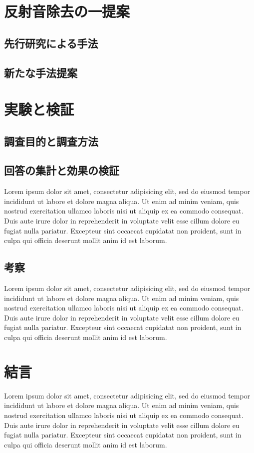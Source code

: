 \documentclass[a4j,12pt]{jarticle}
\begin{document}
\section{反射音除去の一提案}
\subsection{先行研究による手法}
\subsection{新たな手法提案}
\section{実験と検証}
\subsection{調査目的と調査方法}
\subsection{回答の集計と効果の検証}
Lorem ipsum dolor sit amet, consectetur adipisicing elit, sed do eiusmod tempor incididunt ut labore et dolore magna aliqua. Ut enim ad minim veniam, quis nostrud exercitation ullamco laboris nisi ut aliquip ex ea commodo consequat. Duis aute irure dolor in reprehenderit in voluptate velit esse cillum dolore eu fugiat nulla pariatur. Excepteur sint occaecat cupidatat non proident, sunt in culpa qui officia deserunt mollit anim id est laborum.
\subsection{考察}
Lorem ipsum dolor sit amet, consectetur adipisicing elit, sed do eiusmod tempor incididunt ut labore et dolore magna aliqua. Ut enim ad minim veniam, quis nostrud exercitation ullamco laboris nisi ut aliquip ex ea commodo consequat. Duis aute irure dolor in reprehenderit in voluptate velit esse cillum dolore eu fugiat nulla pariatur. Excepteur sint occaecat cupidatat non proident, sunt in culpa qui officia deserunt mollit anim id est laborum.

\section{結言}
Lorem ipsum dolor sit amet, consectetur adipisicing elit, sed do eiusmod tempor incididunt ut labore et dolore magna aliqua. Ut enim ad minim veniam, quis nostrud exercitation ullamco laboris nisi ut aliquip ex ea commodo consequat. Duis aute irure dolor in reprehenderit in voluptate velit esse cillum dolore eu fugiat nulla pariatur. Excepteur sint occaecat cupidatat non proident, sunt in culpa qui officia deserunt mollit anim id est laborum.
\end{document}
